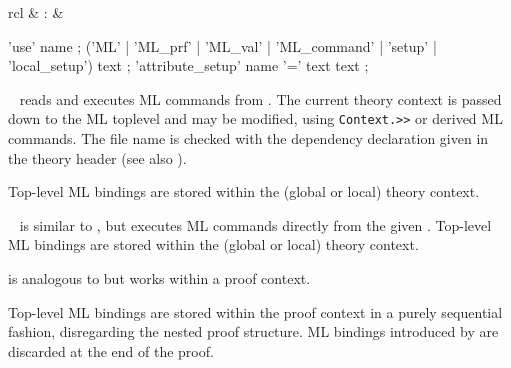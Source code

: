 \begin{isabellebody}
\begin{isamarkuptext}
\begin{matharray}{rcl}
    \hypertarget{command.attribute-setup}{\hyperlink{command.attribute-setup}{\mbox{}}} & : &  \\
  \end{matharray}

  \begin{rail}
    'use' name
    ;
    ('ML' | 'ML_prf' | 'ML_val' | 'ML_command' | 'setup' | 'local_setup') text
    ;
    'attribute_setup' name '=' text text
    ;
  \end{rail}

  \begin{description}

  \item \hyperlink{command.use}{\mbox{}}~ reads and executes ML
  commands from .  The current theory context is passed
  down to the ML toplevel and may be modified, using \verb|Context.>>| or derived ML commands.  The file name is checked with
  the \hyperlink{keyword.uses}{\mbox{}} dependency declaration given in the theory
  header (see also ).

  Top-level ML bindings are stored within the (global or local) theory
  context.
  
  \item \hyperlink{command.ML}{\mbox{}}~ is similar to \hyperlink{command.use}{\mbox{}},
  but executes ML commands directly from the given .
  Top-level ML bindings are stored within the (global or local) theory
  context.

  \item \hyperlink{command.ML-prf}{\mbox{}} is analogous to \hyperlink{command.ML}{\mbox{}} but works
  within a proof context.

  Top-level ML bindings are stored within the proof context in a
  purely sequential fashion, disregarding the nested proof structure.
  ML bindings introduced by \hyperlink{command.ML-prf}{\mbox{}} are discarded at the
  end of the proof.


\end{description}
\end{isamarkuptext}
\end{isabellebody}
